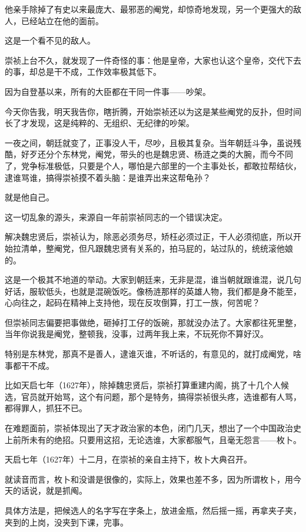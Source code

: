 \begin{multicols}{\theparacolNo}
		他亲手除掉了有史以来最庞大、最邪恶的阉党，却惊奇地发现，另一个更强大的敌人，已经站立在他的面前。

		这是一个看不见的敌人。

		崇祯上台不久，就发现了一件奇怪的事：他是皇帝，大家也认这个皇帝，交代下去的事，却总是干不成，工作效率极其低下。

		因为自登基以来，所有的大臣都在干同一件事——吵架。

		今天你告我，明天我告你，瞎折腾，开始崇祯还以为这是某些阉党的反扑，但时间长了才发现，这是纯粹的、无组织、无纪律的吵架。

		一夜之间，朝廷就变了，正事没人干，尽吵，且极其复杂。当年朝廷斗争，虽说残酷，好歹还分个东林党，阉党，带头的也是魏忠贤、杨涟之类的大腕，而今不同了，党争标准极低，只要是个人，哪怕是六部里的一个主事处长，都敢拉帮结伙，逮谁骂谁，搞得崇祯摸不着头脑：是谁弄出来这帮龟孙？

		就是他自己。

		这一切乱象的源头，来源自一年前崇祯同志的一个错误决定。

		解决魏忠贤后，崇祯认为，除恶必须务尽，矫枉必须过正，干人必须彻底，所以开始拉清单，整阉党，但凡跟魏忠贤有关系的，拍马屁的，站过队的，统统滚他娘的。

		这是一个极其不地道的举动。大家到朝廷来，无非是混，谁当朝就跟谁混，说几句好话，服软低头，也就是混碗饭吃。像杨涟那样的英雄人物，我们都是身不能至，心向往之，起码在精神上支持他，现在反攻倒算，打工一族，何苦呢？

		但崇祯同志偏要把事做绝，砸掉打工仔的饭碗，那就没办法了。大家都往死里整，当年你说我是阉党，整顿我，没事，过两年我上来，不玩死你不算好汉。

		特别是东林党，那真不是善人，逮谁灭谁，不听话的，有意见的，就打成阉党，啥事都干不成。

		比如天启七年（1627年），除掉魏忠贤后，崇祯打算重建内阁，挑了十几个人候选，官员就开始骂，这个有问题，那个是特务，搞得崇祯很头疼，选谁都有人骂，都得罪人，抓狂不已。

		在难题面前，崇祯体现出了天才政治家的本色，闭门几天，想出了一个中国政治史上前所未有的绝招。只要用这招，无论选谁，大家都服气，且毫无怨言——枚卜。

		天启七年（1627年）十二月，在崇祯的亲自主持下，枚卜大典召开。

		就读音而言，枚卜和没谱是很像的，实际上，效果也差不多，因为所谓枚卜，用今天的话说，就是抓阄。

		具体方法是，把候选人的名字写在字条上，放进金瓶，然后摇一摇，再拿夹子夹，夹到的上岗，没夹到下课，完事。


\end{multicols}
